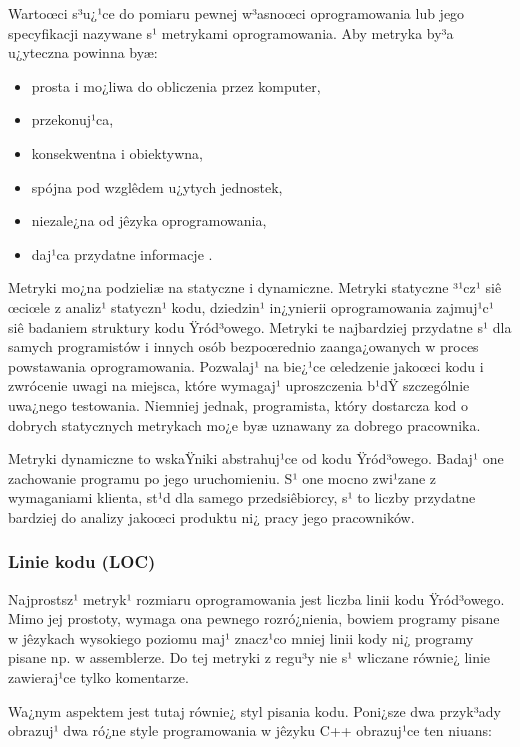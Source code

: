Wartoœci s³u¿¹ce do pomiaru pewnej w³asnoœci oprogramowania lub jego specyfikacji nazywane s¹
metrykami oprogramowania. Aby metryka by³a u¿yteczna powinna byæ:
\begin{itemize}
	\item prosta i mo¿liwa do obliczenia przez komputer,
	\item przekonuj¹ca,
	\item konsekwentna i obiektywna,
	\item spójna pod wzglêdem u¿ytych jednostek,
	\item niezale¿na od jêzyka oprogramowania,
	\item daj¹ca przydatne informacje \cite{website:metric}.
\end{itemize}

Metryki mo¿na podzieliæ na statyczne i dynamiczne. Metryki statyczne ³¹cz¹ siê œciœle z analiz¹ 
statyczn¹ kodu, dziedzin¹ in¿ynierii oprogramowania zajmuj¹c¹ siê badaniem struktury kodu 
Ÿród³owego. Metryki te najbardziej przydatne s¹ dla samych programistów i innych osób bezpoœrednio
zaanga¿owanych w proces powstawania oprogramowania. Pozwalaj¹ na bie¿¹ce œledzenie jakoœci kodu i
zwrócenie uwagi na miejsca, które wymagaj¹ uproszczenia b¹dŸ szczególnie uwa¿nego testowania.
Niemniej jednak, programista, który dostarcza kod o dobrych statycznych metrykach mo¿e byæ uznawany
za dobrego pracownika.

Metryki dynamiczne to wskaŸniki abstrahuj¹ce od kodu Ÿród³owego. Badaj¹ one zachowanie programu po
jego uruchomieniu. S¹ one mocno zwi¹zane z wymaganiami klienta, st¹d dla samego przedsiêbiorcy,
s¹ to liczby przydatne bardziej do analizy jakoœci produktu ni¿ pracy jego pracowników.  

\subsubsection[Linie kodu (LOC)][Linie kodu (LOC)]{Linie kodu (LOC)}
\label{subsubsec:linieKodu}
Najprostsz¹ metryk¹ rozmiaru oprogramowania jest liczba linii kodu Ÿród³owego. Mimo jej prostoty,
wymaga ona pewnego rozró¿nienia, bowiem programy pisane w jêzykach wysokiego poziomu maj¹ znacz¹co
mniej linii kody ni¿ programy pisane np. w assemblerze. Do tej metryki z regu³y nie s¹ wliczane
równie¿ linie zawieraj¹ce tylko komentarze.

Wa¿nym aspektem jest tutaj równie¿ styl pisania kodu. Poni¿sze dwa przyk³ady obrazuj¹ dwa ró¿ne
style programowania w jêzyku C++ obrazuj¹ce ten niuans:

